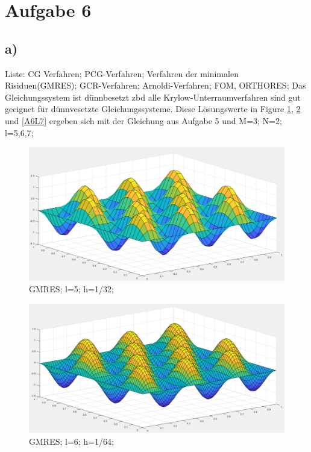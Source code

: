 \documentclass{article}
\begin{document}
\section{Aufgabe 6}
	\subsection{a)}
	Liste: CG Verfahren; PCG-Verfahren; Verfahren der minimalen Risiduen(GMRES); GCR-Verfahren; Arnoldi-Verfahren; FOM, ORTHORES;\newline
	Das Gleichungssystem ist dünnbesetzt zbd alle Krylow-Unterraumverfahren sind gut geeignet für dünnvesetzte Gleichungssysteme.
	Diese Lösungswerte in Figure \ref{A6L5}, \ref{A6L6} und \ref{A6L7} ergeben sich mit der Gleichung aus Aufgabe 5 und M=3; N=2; l=5,6,7;  \newline
\begin{figure}
	\includegraphics[width=\linewidth]{Aufgaben-Ressourcen/A6L5M3N2.png} 
		\caption{GMRES; l=5; h=1/32;}
		\label{A6L5}
\end{figure}
\begin{figure}
	\includegraphics[width=\linewidth]{Aufgaben-Ressourcen/A6L6M3N2.png} 
		\caption{GMRES; l=6; h=1/64;}
		\label{A6L6}
\end{figure}
\end{document}
